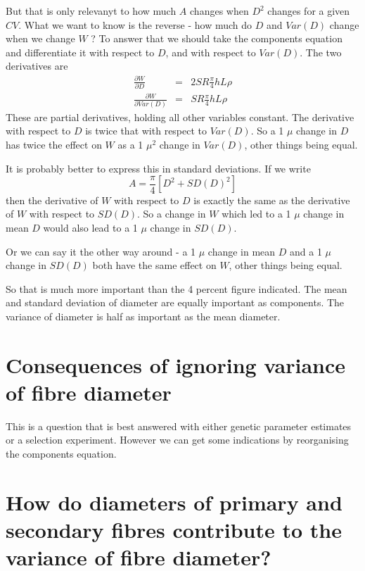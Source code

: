 \documentclass[titlepage]{article}  %
\begin{document}
But that is only relevanyt to how much $A$ changes when $D^{2}$ changes for a given $CV$. What we want to know is the reverse - how much do $D$ and $Var{(D)}$ change when we change $W$ ? To answer that we should take the components equation and differentiate it with respect to $D$, and with respect to $Var{(D)}$. The two derivatives are 
\begin{eqnarray*}
\frac{\partial W}{\partial D} & = & 2 S R \frac{\pi}{4} h L \rho \\
\frac{\partial W}{\partial Var{(D)}} & = & S R \frac{\pi}{4} h L \rho
\end{eqnarray*}
These are partial derivatives, holding all other variables constant. 
The derivative with respect to $D$ is twice that with respect to $Var{(D)}$. So a 1 $\mu$ change in $D$ has twice the effect on $W$ as a 1 $\mu^{2}$ change in $Var{(D)}$, other things being equal.

It is probably better to express this in standard deviations. If we write 
\begin{displaymath}
A = \frac{\pi}{4}[D^{2} + SD{(D)}^{2}]
\end{displaymath}
then the derivative of $W$ with respect to $D$ is exactly the same as the derivative of $W$ with respect to $SD{(D)}$. So a change in $W$ which led to a 1 $\mu$ change in mean $D$ would also lead to a 1 $\mu$ change in $SD{(D)}$. 

Or we can say it the other way around - a 1 $\mu$ change in mean $D$ and a 1 $\mu$ change in $SD{(D)}$ both have the same effect on $W$, other things being equal.

So that is much more important than the 4 percent figure indicated. The mean and standard deviation of diameter are equally important as components. The variance of diameter is half as important as the mean diameter.


\section{Consequences of ignoring variance of fibre diameter}
This is a question that is best answered with either genetic parameter estimates or a selection experiment. However we can get some indications by reorganising the components equation. 

\section{ How do diameters of primary and secondary fibres contribute to the variance of fibre diameter?}
\end{document}
